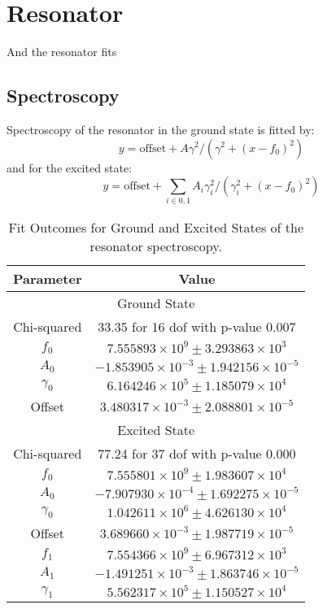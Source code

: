 \newpage
\section{Resonator}
And the resonator fits
\subsection{Spectroscopy}
Spectroscopy of the resonator in the ground state is fitted by:
\begin{equation}
    y = \text{offset} + A\gamma^2/(\gamma^2 + (x - f_0)^2)
\end{equation}
and for the excited state:
\begin{equation}
    y = \text{offset} + \sum_{i\in{0, 1}} A_i\gamma_i^2/(\gamma_i^2 + (x - f_0)^2)
\end{equation}
\begin{table}[h]
\centering
\begin{tabular}{|c|c|}
\hline
Parameter & Value \\
\hline
\multicolumn{2}{|c|}{Ground State} \\
\hline
Chi-squared & 33.35 for 16 dof with p-value 0.007 \\
$f_0$ & $7.555893 \times 10^9 \pm 3.293863 \times 10^3$ \\
$A_0$ & $-1.853905 \times 10^{-3} \pm 1.942156 \times 10^{-5}$ \\
$\gamma_0$ & $6.164246 \times 10^5 \pm 1.185079 \times 10^4$ \\
Offset & $3.480317 \times 10^{-3} \pm 2.088801 \times 10^{-5}$ \\
\hline
\multicolumn{2}{|c|}{Excited State} \\
\hline
Chi-squared & 77.24 for 37 dof with p-value 0.000 \\
$f_0$ & $7.555801 \times 10^9 \pm 1.983607 \times 10^4$ \\
$A_0$ & $-7.907930 \times 10^{-4} \pm 1.692275 \times 10^{-5}$ \\
$\gamma_0$ & $1.042611 \times 10^6 \pm 4.626130 \times 10^4$ \\
Offset & $3.689660 \times 10^{-3} \pm 1.987719 \times 10^{-5}$ \\
$f_1$ & $7.554366 \times 10^9 \pm 6.967312 \times 10^3$ \\
$A_1$ & $-1.491251 \times 10^{-3} \pm 1.863746 \times 10^{-5}$ \\
$\gamma_1$ & $5.562317 \times 10^5 \pm 1.150527 \times 10^4$ \\
\hline
\end{tabular}
\caption{Fit Outcomes for Ground and Excited States of the resonator spectroscopy.}
\label{tab:fit_outcomes_states}
\end{table}
\FloatBarrier

